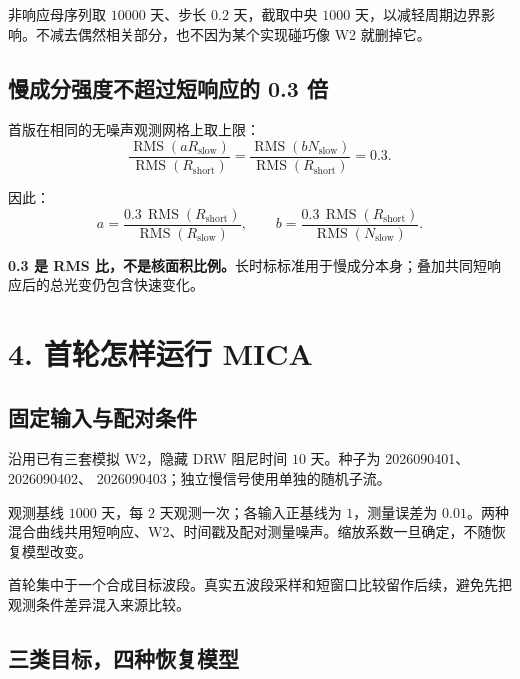 \documentclass[11pt,a4paper]{article}
\newcommand{\RMS}{\operatorname{RMS}}
\begin{document}
{\zhfont 非响应母序列取} $10000$ {\zhfont 天、步长} $0.2$ {\zhfont 天，截取中央} $1000$ {\zhfont 天，以减轻周期边界影响。不减去偶然相关部分，也不因为某个实现碰巧像} W2 {\zhfont 就删掉它。}

\subsection*{{\zhfont 慢成分强度不超过短响应的} 0.3 {\zhfont 倍}}

{\zhfont 首版在相同的无噪声观测网格上取上限：}
\begin{equation}
\frac{\RMS(aR_{\mathrm{slow}})}{\RMS(R_{\mathrm{short}})}
=
\frac{\RMS(bN_{\mathrm{slow}})}{\RMS(R_{\mathrm{short}})}
=0.3.
\end{equation}

{\zhfont 因此：}
\begin{equation}
a=\frac{0.3\,\RMS(R_{\mathrm{short}})}{\RMS(R_{\mathrm{slow}})},
\qquad
b=\frac{0.3\,\RMS(R_{\mathrm{short}})}{\RMS(N_{\mathrm{slow}})}.
\end{equation}

\textbf{0.3 {\zhfont 是} RMS {\zhfont 比，不是核面积比例。}}{\zhfont 长时标标准用于慢成分本身；叠加共同短响应后的总光变仍包含快速变化。}

\newpage
\section*{4. {\zhfont 首轮怎样运行} MICA}

\subsection*{{\zhfont 固定输入与配对条件}}

{\zhfont 沿用已有三套模拟} W2{\zhfont ，隐藏} DRW {\zhfont 阻尼时间} $10$ {\zhfont 天。种子为} 2026090401{\zhfont 、} 2026090402{\zhfont 、} 2026090403{\zhfont ；独立慢信号使用单独的随机子流。}

{\zhfont 观测基线} $1000$ {\zhfont 天，每} $2$ {\zhfont 天观测一次；各输入正基线为} $1${\zhfont ，测量误差为} $0.01${\zhfont 。两种混合曲线共用短响应、}W2{\zhfont 、时间戳及配对测量噪声。缩放系数一旦确定，不随恢复模型改变。}

{\zhfont 首轮集中于一个合成目标波段。真实五波段采样和短窗口比较留作后续，避免先把观测条件差异混入来源比较。}

\subsection*{{\zhfont 三类目标，四种恢复模型}}
\end{document}
